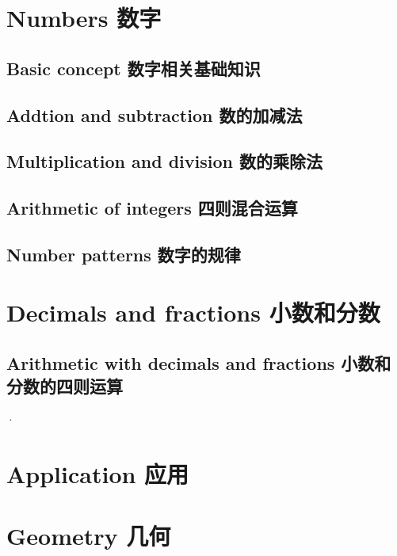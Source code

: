\documentclass[color=green,mathpazo,titlestyle=hang,11pt]{elegantbook}
\author{Lu Wang}
\begin{document}
\maketitle
\tableofcontents
\mainmatter
\chapter{Numbers 数字}

\section{Basic concept  数字相关基础知识}






\section{Addtion and subtraction 数的加减法}




\section{Multiplication and division 数的乘除法}






\section{Arithmetic of integers 四则混合运算}


\section{Number patterns 数字的规律}


\chapter{Decimals and fractions 小数和分数}



\section{Arithmetic with decimals and fractions 小数和分数的四则运算}
·



\chapter{Application 应用}




\chapter{Geometry 几何}




\end{document}
